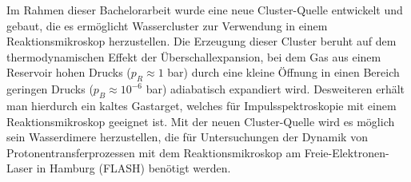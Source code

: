 \begin{center}\large{}\end{center}
%
Im Rahmen dieser Bachelorarbeit wurde eine neue Cluster-Quelle entwickelt und gebaut, die es ermöglicht Wassercluster zur Verwendung in einem Reaktionsmikroskop herzustellen. Die Erzeugung dieser Cluster beruht auf dem thermodynamischen Effekt der Überschallexpansion, bei dem Gas aus einem Reservoir hohen Drucks ($p_R \approx 1 $ bar) durch eine kleine Öffnung in einen Bereich geringen Drucks \linebreak ($p_B \approx 10^{-6}$ bar) adiabatisch expandiert wird. Desweiteren erhält man hierdurch ein kaltes Gastarget, welches für Impulsspektroskopie mit einem Reaktionsmikroskop geeignet ist. Mit der neuen Cluster-Quelle wird es möglich sein Wasserdimere herzustellen, die für Untersuchungen der Dynamik von Protonentransferprozessen mit dem Reaktionsmikroskop am Freie-Elektronen-Laser in Hamburg (FLASH) benötigt werden. 

\clearpage
\thispagestyle{empty}